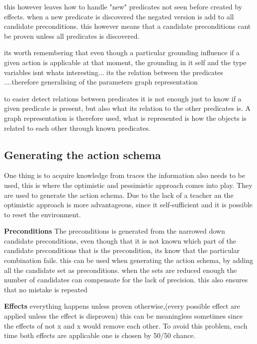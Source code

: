 	this however leaves how to handle "new" predicates not seen before created by effects. when a new predicate is discovered the negated version is add to all candidate preconditions. this however means that a candidate preconditions cant be proven unless all predicates is discovered. 


	its worth remembering that even though a particular grounding influence if a given action is applicable at that moment, the grounding in it self and the type variables isnt whats interesting... its the relation between the predicates ....therefore generalising of the parameters
	graph representation
	
	to easier detect relations between predicates it is not enough just to know if a given predicate is present, but also what its relation to the other predicates is. A graph representation is therefore used, what is represented is how the objects is related to each other through known predicates.


\subsection{Generating the action schema}
One thing is to acquire knowledge from traces the information also needs to be used, this is where the optimistic and pessimistic approach comes into play. They are used to generate the action schema. Due to the lack of a teacher an the optimistic approach is more advantageous, since it self-sufficient and it is possible to reset the environment.


\textbf{Preconditions}
The preconditions is generated from the narrowed down candidate preconditions, even though that it is not known which part of the candidate preconditions that is the precondition, its know that the particular combination fails. this can be used when generating the action schema, by adding all the candidate set as preconditions. when the sets are reduced enough the number of candidates can compensate for the lack of precision. this also ensures that no mistake is repeated


\textbf{Effects}
everything happens unless proven otherwise,(every possible effect are applied unless the effect is disproven) this can be meaningless sometimes since the effects of not x and x would remove each other. To avoid this problem, each time both effects are applicable one is chosen by 50/50 chance.
